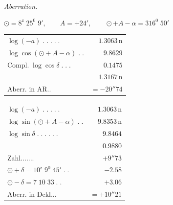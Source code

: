 \begin{center}
\textit{Aberration.}\par\medskip
$\odot=8^{\mathrm z}\;25^0\;9',\qquad A=+24',\qquad \odot+A-\alpha=316^0\;50'$
\par\medskip
\begin{minipage}[t]{.48\textwidth}\centering\footnotesize
\begin{tabular}[t]{@{}lr@{}}
$\log(-a)\;.\;.\;.\;.\;.$&$1.3063\,\mathrm n$\\
$\log\cos(\odot+A-\alpha)\;.\;.$&$9.8629$\\
$\text{Compl.}\;\log\cos\delta\;.\;.\;.$&$0.1475$\\\hline
&$1.3167\,\mathrm n$\\
Aberr. in AR.\;.&$=-20''74$
\end{tabular}
\end{minipage}\hfill
\begin{minipage}[t]{.49\textwidth}\centering\footnotesize
\begin{tabular}[t]{@{}lr@{}}
$\log(-a)\;.\;.\;.\;.\;.$&$1.3063\,\mathrm n$\\
$\log\sin(\odot+A-\alpha)\;.\;.$&$9.8353\,\mathrm n$\\
$\log\sin\delta\;.\;.\;.\;.\;.\;.$&$9.8464$\\\hline
&$0.9880$\\
Zahl\;.\;.\;.\;.\;.\;.\;.&$+9''73$\\
$\odot+\delta=10^{\mathrm z}\;9^0\;45'\;.\;.$&$-2.58$\\
$\odot-\delta=7\;10\;33\;.\;.$&$+3.06$\\\hline
Aberr. in Dekl.\;.\;.&$=+10''21$
\end{tabular}
\end{minipage}
\end{center}
\clearpage{}
